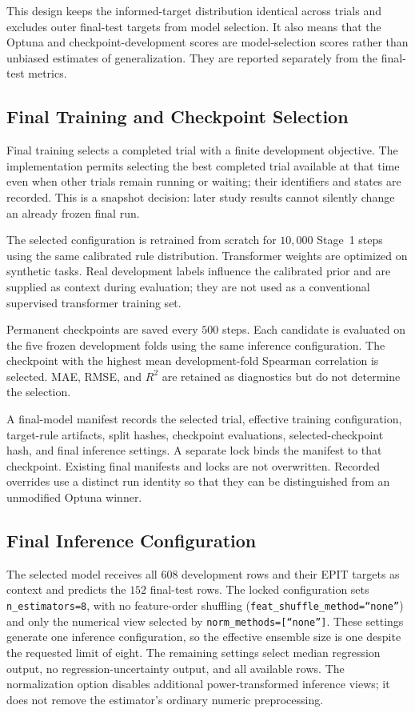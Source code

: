 \documentclass{article}
\begin{document}
This design keeps the informed-target distribution identical across trials
and excludes outer final-test targets from model selection. It also means
that the Optuna and checkpoint-development scores are model-selection scores
rather than unbiased estimates of generalization. They are reported separately
from the final-test metrics.

\subsection{Final Training and Checkpoint Selection}

Final training selects a completed trial with a finite development objective.
The implementation permits selecting the best completed trial available at
that time even when other trials remain running or waiting; their identifiers
and states are recorded. This is a snapshot decision: later study results
cannot silently change an already frozen final run.

The selected configuration is retrained from scratch for \(10{,}000\)
Stage~1 steps using the same calibrated rule distribution. Transformer weights
are optimized on synthetic tasks. Real development labels influence the
calibrated prior and are supplied as context during evaluation; they are not
used as a conventional supervised transformer training set.

Permanent checkpoints are saved every \(500\) steps. Each candidate is
evaluated on the five frozen development folds using the same inference
configuration. The checkpoint with the highest mean development-fold Spearman
correlation is selected. MAE, RMSE, and \(R^2\) are retained as diagnostics
but do not determine the selection.

A final-model manifest records the selected trial, effective training
configuration, target-rule artifacts, split hashes, checkpoint evaluations,
selected-checkpoint hash, and final inference settings. A separate lock binds
the manifest to that checkpoint. Existing final manifests and locks are not
overwritten. Recorded overrides use a distinct run identity so that they can
be distinguished from an unmodified Optuna winner.

\subsection{Final Inference Configuration}

The selected model receives all \(608\) development rows and their EPIT
targets as context and predicts the \(152\) final-test rows. The locked
configuration sets \texttt{n\_estimators=8}, with no feature-order shuffling
(\texttt{feat\_shuffle\_method=``none''}) and only the numerical view selected
by \texttt{norm\_methods=[``none'']}. These settings generate one inference
configuration, so the effective ensemble size is one despite the requested
limit of eight. The remaining settings select median regression output,
no regression-uncertainty output, and all available rows. The normalization
option disables additional power-transformed inference views; it does not
remove the estimator's ordinary numeric preprocessing.
\end{document}
